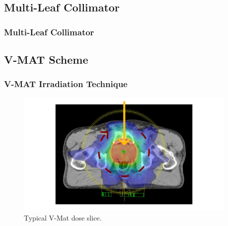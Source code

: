 \documentclass{beamer}
\begin{document}
	\subsection{Multi-Leaf Collimator}
	\begin{frame}
		\frametitle{Multi-Leaf Collimator}
	\end{frame}
	
	\subsection{V-MAT Scheme}
	\begin{frame}
		\frametitle{V-MAT Irradiation Technique}
		\begin{figure}
			\includegraphics[height=6cm]{vector_images/example_dose_vmat_arrows.pdf}
			\caption{Typical V-Mat dose slice.}
		\end{figure}
	\end{frame}
	
\end{document}
